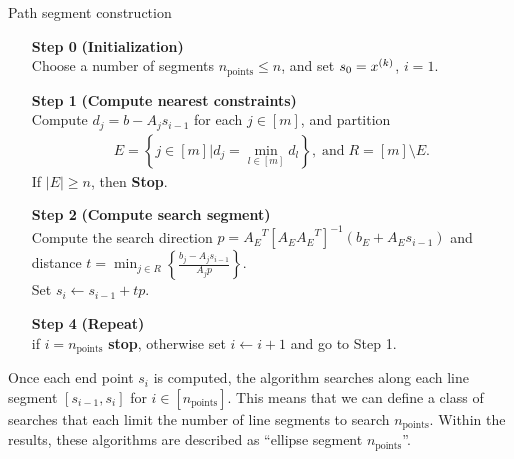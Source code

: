 \documentclass{article}
\begin{document}
{
\begin{fullwidth}[leftmargin=0in, rightmargin=0in, width=\linewidth-0.5in]
\begin{flushleft}


\begin{algorithm}[H]
    \caption{Path segment construction}
    \label{segment_construction}
    \begin{itemize}
        \item[\textbf{Step 0}] \textbf{(Initialization)} \\
            Choose a number of segments $n_{\text{points}} \le n$, and set $s_0 = x^{(k)}$, $i=1$.
            
        \item[\textbf{Step 1}] \textbf{(Compute nearest constraints)} \\
			Compute $d_j = b - A_j s_{i-1}$ for each $j \in [m]$, and partition 
			\begin{align*}
			E = \left\{j \in [m] \bigg| d_j = \min_{l \in [m]} d_l\right\}, \; \textrm{and} \; R = [m] \setminus E.
			\end{align*}
			If $|E| \ge n$, then \textbf{Stop}.
			
            
        \item[\textbf{Step 2}] \textbf{(Compute search segment)} \\
        	Compute the search direction $p = {A_E}^T\left[A_E{A_E}^T\right]^{-1}\left(b_E + A_E s_{i-1}\right)$
        	and distance $t = \min_{j \in R} \left\{\frac{b_j - A_j s_{i-1}}{A_jp}  \right\}$. \\
        	Set $s_i \gets s_{i-1} + tp$.
        	
        \item[\textbf{Step 4}] \textbf{(Repeat)} \\
        if $i = n_{\text{points}}$ \textbf{stop}, otherwise set $i \gets i+1$ and go to Step 1.
    \end{itemize}
\end{algorithm}

\end{flushleft}
\end{fullwidth}
}



Once each end point $s_i$ is computed, the algorithm searches along each line segment $[s_{i-1}, s_i]$ for $i \in [n_{\text{points}}]$.
This means that we can define a class of searches that each limit the number of line segments to search $n_{\text{points}}$.
Within the results, these algorithms are described as ``ellipse segment $n_{\text{points}}$''.
\end{document}
